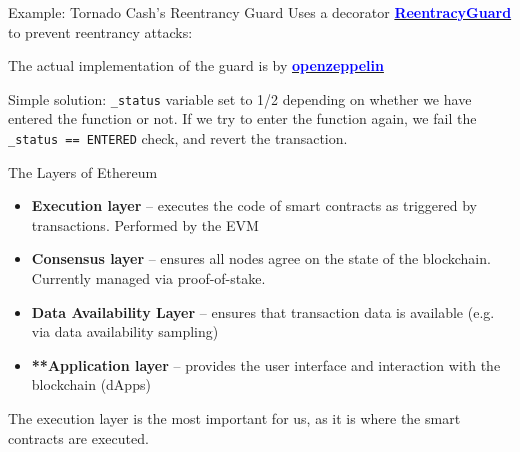 \documentclass[aspectratio=169]{beamer}
\newcommand{\bluelink}[2]{\href{#1}{\textcolor{blue}{\textbf{#2}}}}
\begin{document}
\begin{frame}{Example: Tornado Cash's Reentrancy Guard}
Uses a decorator
\bluelink{https://github.com/tornadocash/tornado-core/blob/master/contracts/Tornado.sol}{ReentracyGuard}
to prevent reentrancy attacks:
\bigskip

The actual implementation of the guard is by
\bluelink{https://github.com/OpenZeppelin/openzeppelin-contracts/blob/master/contracts/utils/ReentrancyGuard.sol}{openzeppelin}
\bigskip

Simple solution: \texttt{\_status} variable set to 1/2 depending on whether
we have entered the function or not. If we try to enter the function again, we
fail the \texttt{\_status == ENTERED} check, and revert the transaction.
\end{frame}

\begin{frame}{The Layers of Ethereum}
\begin{itemize}
    \item \textbf{Execution layer} -- executes the code of smart contracts as triggered by
        transactions. Performed by the EVM
    \item \textbf{Consensus layer} -- ensures all nodes agree on the state of the blockchain.
        Currently managed via proof-of-stake.
    \item \textbf{Data Availability Layer} --  ensures that transaction data is
        available (e.g. via data availability sampling)
    \item \textbf{**Application layer} -- provides the user interface and
        interaction with the blockchain (dApps)
\end{itemize}
\bigskip

The execution layer is the most important for us, as it is where the smart
contracts are executed.
\end{frame}
\end{document}
